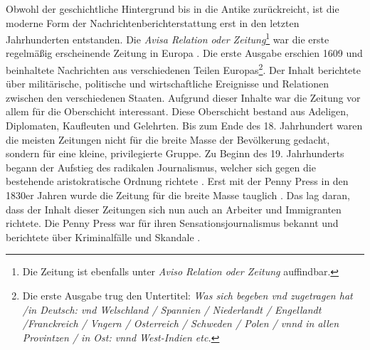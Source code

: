 Obwohl der geschichtliche Hintergrund bis in die Antike zurückreicht, ist die moderne Form der Nachrichtenberichterstattung erst in den letzten Jahrhunderten entstanden.
Die \textit{Avisa Relation oder Zeitung}\footnote{Die Zeitung ist ebenfalls unter \textit{Aviso Relation oder Zeitung} auffindbar.} war die erste regelmäßig erscheinende Zeitung in Europa \cite{aviso-relation-oder-zeitung}.
Die erste Ausgabe erschien 1609 und beinhaltete Nachrichten aus verschiedenen Teilen Europas\footnote{Die erste Ausgabe trug den Untertitel: \textit{Was sich begeben vnd zugetragen hat /in Deutsch: vnd Welschland / Spannien / Niederlandt / Engellandt /Franckreich / Vngern / Osterreich / Schweden / Polen / vnnd in allen Provintzen / in Ost: vnnd West-Indien etc.}}.
Der Inhalt berichtete über militärische, politische und wirtschaftliche Ereignisse und Relationen zwischen den verschiedenen Staaten.
Aufgrund dieser Inhalte war die Zeitung vor allem für die Oberschicht interessant.
Diese Oberschicht bestand aus Adeligen, Diplomaten, Kaufleuten und Gelehrten.
Bis zum Ende des 18. Jahrhundert waren die meisten Zeitungen nicht für die breite Masse der Bevölkerung gedacht, sondern für eine kleine, privilegierte Gruppe.
Zu Beginn des 19. Jahrhunderts begann der Aufstieg des radikalen Journalismus, welcher sich gegen die bestehende aristokratische Ordnung richtete \cite{media-democracy}.
Erst mit der Penny Press in den 1830er Jahren wurde die Zeitung für die breite Masse tauglich \cite{precursor-media-penny-press}.
Das lag daran, dass der Inhalt dieser Zeitungen sich nun auch an Arbeiter und Immigranten richtete.
Die Penny Press war für ihren Sensationsjournalismus bekannt und berichtete über Kriminalfälle und Skandale \cite{penny-press}.\\

